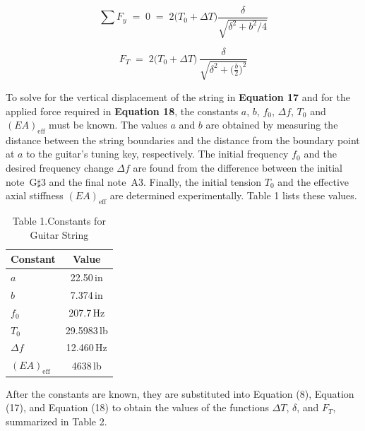 \documentclass[12pt]{article}
\theoremstyle{definition} %
\theoremstyle{plain} %
\begin{document}
\begin{equation}
  \sum F_y \;=\; 0
  \;=\;
  2\bigl(T_0+\Delta T\bigr)
  \frac{\delta}{\sqrt{\delta^{2}+b^{2}/4}}
  \tag{18}
\end{equation}

\begin{equation}
  F_T
  \;=\;
  2\bigl(T_0+\Delta T\bigr)\,
  \frac{\delta}{\sqrt{\delta^{2}+\bigl(\frac{b}{2}\bigr)^{2}}}
  \tag{19}
\end{equation}

To solve for the vertical displacement of the string in \textbf{Equation 17}
and for the applied force required in \textbf{Equation 18}, the constants
$a$, $b$, $f_0$, $\Delta f$, $T_0$ and $(EA)_{\text{eff}}$
must be known.  The values $a$ and $b$ are obtained by measuring the
distance between the string boundaries and the distance from the boundary
point at $a$ to the guitar’s tuning key, respectively.  The initial
frequency $f_0$ and the desired frequency change $\Delta f$ are found
from the difference between the initial note~G$\sharp$3 and the final
note~A3.  Finally, the initial tension $T_0$ and the effective axial
stiffness $(EA)_{\text{eff}}$ are determined experimentally.
Table 1 lists these values.

\begin{table}[ht]
  \centering
  \caption*{Table 1.\;Constants for Guitar String}
  \begin{tabular}{|l|c|}
  \hline
  \textbf{Constant} & \textbf{Value} \\ \hline
  $a$               & 22.50\,in \\ \hline
  $b$               & 7.374\,in \\ \hline
  $f_0$             & 207.7\,Hz \\ \hline
  $T_0$             & 29.5983\,lb \\ \hline
  $\Delta f$        & 12.460\,Hz \\ \hline
  $(EA)_{\text{eff}}$ & 4638\,lb \\ \hline
  \end{tabular}
  \end{table}
  
  After the constants are known, they are substituted into
  Equation (8), Equation (17), and Equation (18) to obtain
  the values of the functions $\Delta T$, $\delta$, and $F_T$,
  summarized in Table 2.
  
\end{document}
